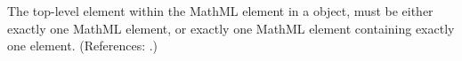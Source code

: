 The top-level element within the MathML  element in a
\FunctionDefinition object,  must be either exactly one MathML 
element, or exactly one MathML  element containing exactly
one  element.  (References: .)
